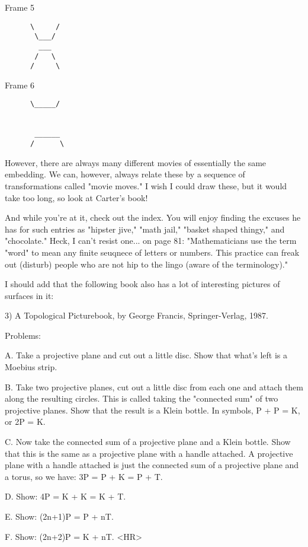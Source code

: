 Frame 5

\begin{verbatim}
      \     /
       \___/
        ___
       /   \
      /     \
\end{verbatim}
    

Frame 6

\begin{verbatim}
      \_____/
      
      
       ______     
      /      \
\end{verbatim}
    

However, there are always many different movies of essentially the same
embedding.  We can, however, always relate these by a sequence of
transformations called "movie moves."  I wish I could draw these, but it
would take too long, so look at Carter's book!  

And while you're at it, check out the index.  You will enjoy finding the
excuses he has for such entries as "hipster jive," "math jail," "basket
shaped thingy," and "chocolate."  Heck, I can't resist one... on page
81: "Mathematicians use the term "word" to mean any finite seuqnece of
letters or numbers.  This practice can freak out (disturb) people who
are not hip to the lingo (aware of the terminology)."

I should add that the following book also has a lot of interesting
pictures of surfaces in it:

3) A Topological Picturebook, by George Francis, Springer-Verlag, 1987.

Problems:
                   
A. Take a projective plane and cut out a little disc.  Show that what's
left is a Moebius strip.
                   
B. Take two projective planes, cut out a little disc from each one and
attach them along the resulting circles.  This is called taking the
"connected sum" of two projective planes.  Show that the result is a
Klein bottle.  In symbols, P + P = K, or 2P = K.
                  
C. Now take the connected sum of a projective plane and a Klein bottle.
Show that this is the same as a projective plane with a handle attached.
A projective plane with a handle attached is just the connected sum of a
projective plane and a torus, so we have: 3P = P + K = P + T.
                 
D. Show:  4P = K + K = K + T.
                 
E. Show: (2n+1)P = P + nT.
                 
F. Show: (2n+2)P = K + nT.
<HR>



